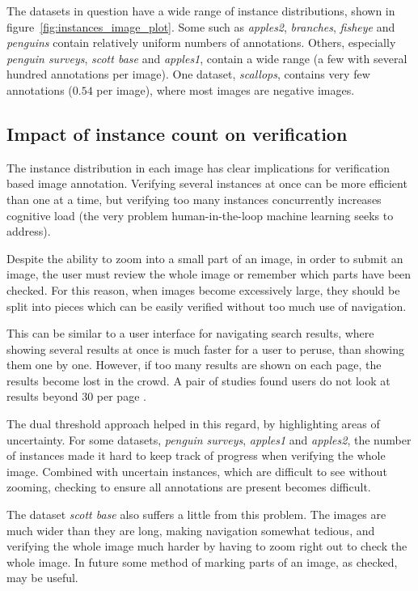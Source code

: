 The datasets in question have a wide range of instance distributions, shown in figure~\ref{fig:instances_image_plot}. Some such as \emph{apples2}, \emph{branches}, \emph{fisheye} and \emph{penguins} contain relatively uniform numbers of annotations. Others, especially \emph {penguin surveys}, \emph{scott base} and \emph{apples1}, contain a wide range (a few with several hundred annotations per image). One dataset, \emph{scallops}, contains very few annotations ($0.54$ per image), where most images are negative images.

\subsection {Impact of instance count on verification}
\label{sec:impact_instances}

The instance distribution in each image has clear implications for verification based image annotation. Verifying several instances at once can be more efficient than one at a time, but verifying too many instances concurrently increases cognitive load (the very problem human-in-the-loop machine learning seeks to address). 

Despite the ability to zoom into a small part of an image, in order to submit an image, the user must review the whole image or remember which parts have been checked. For this reason, when images become excessively large, they should be split into pieces which can be easily verified without too much use of navigation.

This can be similar to a user interface for navigating search results, where showing several results at once is much faster for a user to peruse, than showing them one by one. However, if too many results are shown on each page, the results become lost in the crowd. A pair of studies found users do not look at results beyond 30 per page \cite{PunchoojitLumpapun2017, Zhou2007}.

The dual threshold approach helped in this regard, by highlighting areas of uncertainty. For some datasets, \emph{penguin surveys}, \emph{apples1} and \emph{apples2}, the number of instances made it hard to keep track of progress when verifying the whole image. Combined with uncertain instances, which are difficult to see without zooming, checking to ensure all annotations are present becomes difficult.

The dataset \emph{scott base} also suffers a little from this problem. The images are much wider than they are long, making navigation somewhat tedious, and verifying the whole image much harder by having to zoom right out to check the whole image. In future some method of marking parts of an image, as checked, may be useful.

